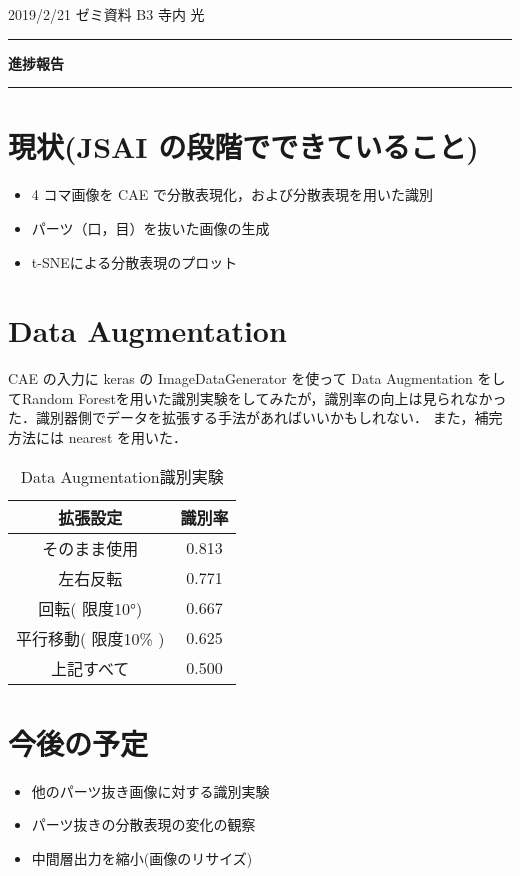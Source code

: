 \documentclass[onecolumn]{ujarticle}     %
\begin{document}
	
% 

\noindent

\hspace{1em}
2019/2/21
ゼミ資料
\hfill
B3 寺内 光

\vspace{2mm}

\hrule

\begin{center}
{\Large \bf 進捗報告}
\end{center}


\hrule
\vspace{3mm}

\section{現状(JSAI の段階でできていること)}
	\begin{itemize}
		\item 4 コマ画像を CAE で分散表現化，および分散表現を用いた識別
		\item パーツ（口，目）を抜いた画像の生成
		\item t-SNEによる分散表現のプロット
	\end{itemize}
\section{Data Augmentation}
	CAE の入力に keras の ImageDataGenerator を使って Data Augmentation をしてRandom Forestを用いた識別実験をしてみたが，識別率の向上は見られなかった．識別器側でデータを拡張する手法があればいいかもしれない．
	また，補完方法には nearest を用いた．
	
	\begin{table}[h]
		\centering
		\caption{Data Augmentation識別実験}
		\begin{tabular}{|c|c|} \hline
			拡張設定&識別率\\ \hline\hline
			そのまま使用&0.813\\ \hline
			左右反転&0.771\\ \hline
			回転( 限度10°)&0.667\\ \hline
			平行移動( 限度10\% )&0.625\\ \hline
			上記すべて&0.500\\ \hline
		\end{tabular}
	\end{table}

\section{今後の予定}
	\begin{itemize}
		\item 他のパーツ抜き画像に対する識別実験
		\item パーツ抜きの分散表現の変化の観察
		\item 中間層出力を縮小(画像のリサイズ)
	\end{itemize}
\end{document}
